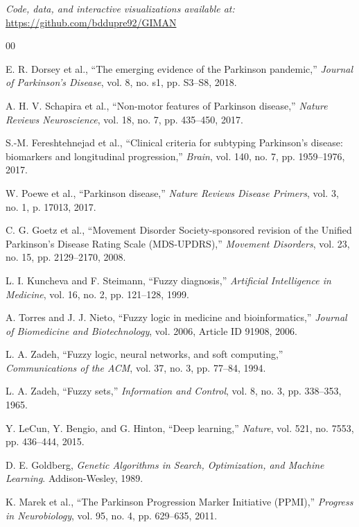 \documentclass[conference]{IEEEtran}
\begin{document}
\textit{Code, data, and interactive visualizations available at:} \url{https://github.com/bddupre92/GIMAN}

\begin{thebibliography}{00}

E. R. Dorsey et al., ``The emerging evidence of the Parkinson pandemic,'' \textit{Journal of Parkinson's Disease}, vol. 8, no. s1, pp. S3--S8, 2018.

A. H. V. Schapira et al., ``Non-motor features of Parkinson disease,'' \textit{Nature Reviews Neuroscience}, vol. 18, no. 7, pp. 435--450, 2017.

S.-M. Fereshtehnejad et al., ``Clinical criteria for subtyping Parkinson's disease: biomarkers and longitudinal progression,'' \textit{Brain}, vol. 140, no. 7, pp. 1959--1976, 2017.

W. Poewe et al., ``Parkinson disease,'' \textit{Nature Reviews Disease Primers}, vol. 3, no. 1, p. 17013, 2017.

C. G. Goetz et al., ``Movement Disorder Society-sponsored revision of the Unified Parkinson's Disease Rating Scale (MDS-UPDRS),'' \textit{Movement Disorders}, vol. 23, no. 15, pp. 2129--2170, 2008.

L. I. Kuncheva and F. Steimann, ``Fuzzy diagnosis,'' \textit{Artificial Intelligence in Medicine}, vol. 16, no. 2, pp. 121--128, 1999.

A. Torres and J. J. Nieto, ``Fuzzy logic in medicine and bioinformatics,'' \textit{Journal of Biomedicine and Biotechnology}, vol. 2006, Article ID 91908, 2006.

L. A. Zadeh, ``Fuzzy logic, neural networks, and soft computing,'' \textit{Communications of the ACM}, vol. 37, no. 3, pp. 77--84, 1994.

L. A. Zadeh, ``Fuzzy sets,'' \textit{Information and Control}, vol. 8, no. 3, pp. 338--353, 1965.

Y. LeCun, Y. Bengio, and G. Hinton, ``Deep learning,'' \textit{Nature}, vol. 521, no. 7553, pp. 436--444, 2015.

D. E. Goldberg, \textit{Genetic Algorithms in Search, Optimization, and Machine Learning}. Addison-Wesley, 1989.

K. Marek et al., ``The Parkinson Progression Marker Initiative (PPMI),'' \textit{Progress in Neurobiology}, vol. 95, no. 4, pp. 629--635, 2011.


\end{thebibliography}
\end{document}
